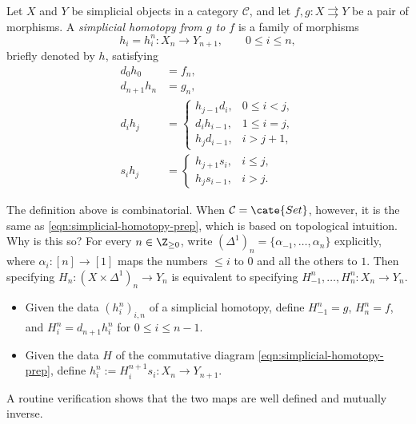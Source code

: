 \begin{definition}\label{def:simplicial-homotopy}
	Let $X$ and $Y$ be simplicial objects in a category $\mathcal{C}$, and let
	$f,g:X\rightrightarrows Y$ be a pair of morphisms. A \emph{simplicial
	homotopy from $g$ to $f$} is a family of morphisms
	\[
	h_i=h_i^n:X_n\to Y_{n+1},\qquad0\leq i\leq n,
	\]
	briefly denoted by $h$, satisfying
	\begin{align*}
		d_0h_0&=f_n,\\
		d_{n+1}h_n&=g_n,\\
		d_ih_j&=
		\begin{cases}
			h_{j-1}d_i,&0\leq i<j,\\
			d_ih_{i-1},&1\leq i=j,\\
			h_jd_{i-1},&i>j+1,
		\end{cases}\\
		s_ih_j&=
		\begin{cases}
			h_{j+1}s_i,&i\leq j,\\
			h_js_{i-1},&i>j.
		\end{cases}
	\end{align*}
\end{definition}

The definition above is combinatorial. When $\mathcal{C}=\cate{Set}$,
however, it is the same as \eqref{eqn:simplicial-homotopy-prep}, which is
based on topological intuition. Why is this so? For every
$n\in\Z_{\geq0}$, write
$(\Delta^1)_n=\{\alpha_{-1},\ldots,\alpha_n\}$ explicitly, where
$\alpha_i:[n]\to[1]$ maps the numbers $\leq i$ to $0$ and all the others
to $1$. Then specifying $H_n:(X\times\Delta^1)_n\to Y_n$ is equivalent to
specifying $H_{-1}^n,\ldots,H_n^n:X_n\to Y_n$.
\begin{itemize}
	\item Given the data $(h_i^n)_{i,n}$ of a simplicial homotopy, define
	$H_{-1}^n=g$, $H_n^n=f$, and $H_i^n=d_{n+1}h_i^n$ for
	$0\leq i\leq n-1$.
	\item Given the data $H$ of the commutative diagram
	\eqref{eqn:simplicial-homotopy-prep}, define
	$h_i^n:=H_i^{n+1}s_i:X_n\to Y_{n+1}$.
\end{itemize}
A routine verification shows that the two maps are well defined and mutually
inverse.


